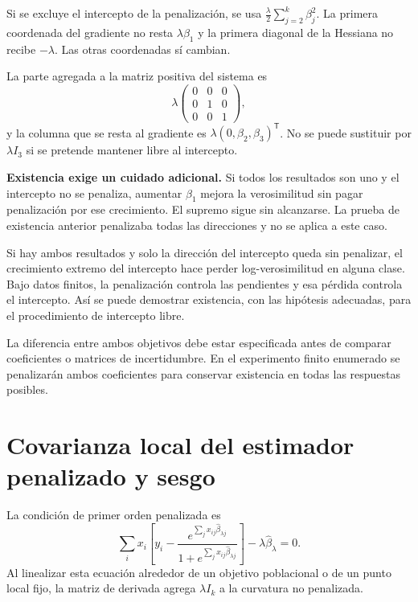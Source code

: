 \documentclass[11pt,a4paper]{article}
\newcommand{\T}{^{\mathsf T}}
\begin{document}
Si se excluye el intercepto de la penalización,
se usa $\frac\lambda2\sum_{j=2}^k\beta_j^2$.
La primera coordenada del gradiente no resta
$\lambda\beta_1$ y la primera diagonal de la Hessiana
no recibe $-\lambda$.
Las otras coordenadas sí cambian.

\begin{ejemplo}
La parte agregada a la matriz positiva del sistema es
\[
\lambda\begin{pmatrix}0&0&0\\0&1&0\\0&0&1\end{pmatrix},
\]
y la columna que se resta al gradiente es
$\lambda(0,\beta_2,\beta_3)\T$.
No se puede sustituir por $\lambda I_3$ si se pretende
mantener libre al intercepto.
\end{ejemplo}
\textbf{Existencia exige un cuidado adicional.}
Si todos los resultados son uno y el intercepto
no se penaliza, aumentar $\beta_1$ mejora la
verosimilitud sin pagar penalización por ese crecimiento.
El supremo sigue sin alcanzarse.
La prueba de existencia anterior penalizaba todas
las direcciones y no se aplica a este caso.

Si hay ambos resultados y solo la dirección del
intercepto queda sin penalizar, el crecimiento extremo
del intercepto hace perder log-verosimilitud en
alguna clase. Bajo datos finitos, la penalización
controla las pendientes y esa pérdida controla
el intercepto.
Así se puede demostrar existencia, con las hipótesis
adecuadas, para el procedimiento de intercepto libre.

La diferencia entre ambos objetivos debe estar
especificada antes de comparar coeficientes o
matrices de incertidumbre.
En el experimento finito enumerado se penalizarán
ambos coeficientes para conservar existencia en
todas las respuestas posibles.

\clearpage
\section{Covarianza local del estimador penalizado y sesgo}\label{logit67}
La condición de primer orden penalizada es
\[
\sum_i x_i\left[
y_i-\frac{e^{\sum_jx_{ij}\widehat\beta_{\lambda j}}}
{1+e^{\sum_jx_{ij}\widehat\beta_{\lambda j}}}\right]
-\lambda\widehat\beta_\lambda=0.
\]
Al linealizar esta ecuación alrededor de un
objetivo poblacional o de un punto local fijo,
la matriz de derivada agrega $\lambda I_k$ a
la curvatura no penalizada.
\end{document}
